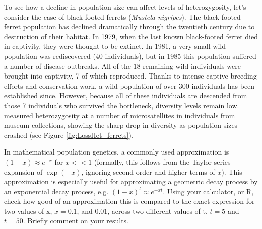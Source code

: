 To see how a decline in population size can affect levels of
heterozygosity, let's consider the case of black-footed ferrets ({\it Mustela nigripes}). The black-footed ferret population has declined dramatically through the twentieth century due
to destruction of their habitat.  In 1979, when the last known black-footed ferret died in captivity, they were thought to be
extinct. In 1981, a very small wild population was rediscovered ($40$ individuals), but in 1985 this population
suffered a number of disease outbreaks. All of the $18$ remaining wild individuals
were brought into captivity, 7 of which
reproduced. Thanks to intense captive breeding efforts and conservation work, a
wild population of over 300 individuals has been established
since. However, because all of these individuals are descended from
those 7 individuals who survived the bottleneck, diversity levels
remain low.  \citeauthor{Wisely:02} measured heterozygosity at a number
of microsatellites in individuals from museum collections, showing the sharp drop in diversity as population sizes crashed (see Figure \ref{fig:LossHet_ferrets}).

\begin{question} \label{geo_question} In mathematical population genetics, a
  commonly used approximation is $(1-x) \approx e^{-x}$ for $x << 1$ (formally,
  this follows from the Taylor series expansion of $\exp(-x)$, ignoring second
  order and higher terms of $x$).  This approximation is especially useful for approximating a geometric
  decay process by an exponential decay process, e.g. $(1 - x)^t \approx e^{-xt}$. Using your calculator, or R, check how good of an approximation this is compared to the exact expression for two values of x, $x = 0.1$, and $0.01$, across two different values of t, $t=5$ and $t=50$. Briefly comment on your results.

\end{question}


